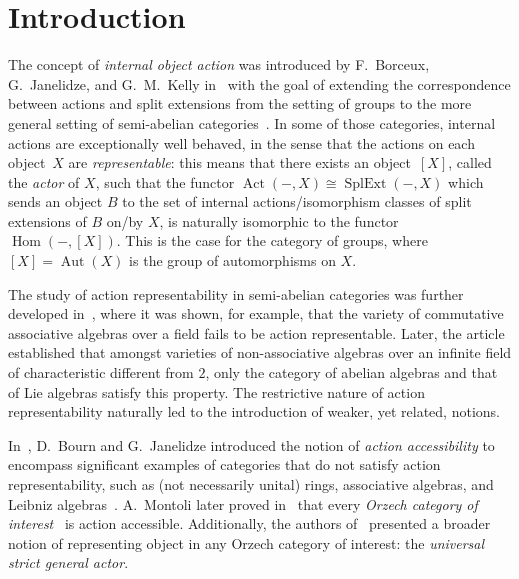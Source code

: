 \documentclass[reqno,a4paper]{amsart}
\theoremstyle{plain}
\theoremstyle{definition}
\theoremstyle{remark}
\numberwithin{equation}{section}
\DeclareMathOperator{\Aut}{Aut}
\DeclareMathOperator{\Act}{Act}
\DeclareMathOperator{\Hom}{Hom}
\DeclareMathOperator{\SplExt}{SplExt}
\begin{document}

\maketitle

\section{Introduction}\label{SecIntro}

The concept of \emph{internal object action} was introduced by F.~Borceux, G.~Janelidze, and G.~M.~Kelly in~\cite{BJK} with the goal of extending the correspondence between actions and split extensions from the setting of groups to the more general setting of semi-abelian categories~\cite{Semi-Ab}. In some of those categories, internal actions are exceptionally well behaved, in the sense that the actions on each object~$X$ are \emph{representable}: this means that there exists an object~$[X]$, called the \emph{actor} of $X$, such that the functor $\Act(-,X) \cong \SplExt(-,X)$ which sends an object $B$ to the set of internal actions/isomorphism classes of split extensions of $B$ on/by $X$, is naturally isomorphic to the functor $\Hom(-,[X])$. This is the case for the category of groups, where $[X]=\Aut(X)$ is the group of automorphisms on $X$. 

The study of action representability in semi-abelian categories was further developed in~\cite{BJK2}, where it was shown, for example, that the variety of commutative associative algebras over a field fails to be action representable. Later, the article~\cite{Tim} established that amongst varieties of non-associative algebras over an infinite field of characteristic different from $2$, only the category of abelian algebras and that of Lie algebras satisfy this property. The restrictive nature of action representability naturally led to the introduction of weaker, yet related, notions.

In~\cite{act_accessible}, D.~Bourn and G.~Janelidze introduced the notion of \emph{action accessibility} to encompass significant examples of categories that do not satisfy action representability, such as (not necessarily unital) rings, associative algebras, and Leibniz algebras~\cite{loday}. A.~Montoli later proved in~\cite{Montoli} that every \emph{Orzech category of interest}~\cite{Orzech} is action accessible. Additionally, the authors of~\cite{Casas} presented a broader notion of representing object in any Orzech category of interest: the \emph{universal strict general actor}.
\end{document}

